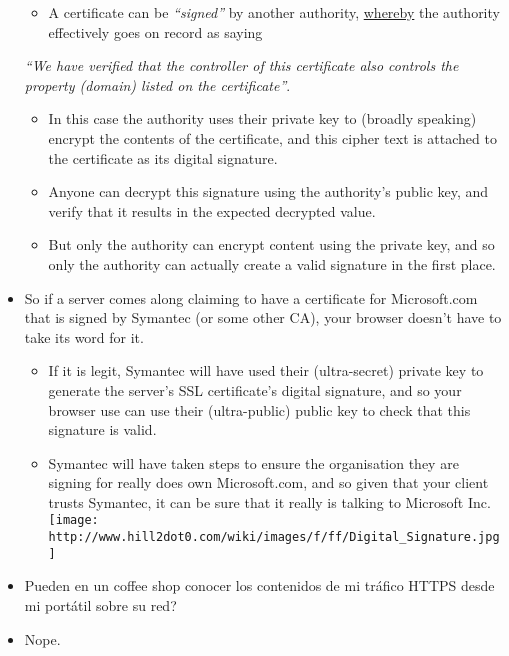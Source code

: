 \begin{itemize}
  \begin{itemize}
  \itemsep1pt\parskip0pt
  \item
    A certificate can be \emph{``signed''} by another authority,
    \href{https://www.google.es/webhp?sourceid=chrome-instant\&ion=1\&espv=2\&ie=UTF-8\#q=define\%20whereby}{whereby}
    the authority effectively goes on record as saying
  \end{itemize}

  \emph{``We have verified that the controller of this certificate also
  controls the property (domain) listed on the certificate''}.

  \begin{itemize}
  \itemsep1pt\parskip0pt
  \item
    In this case the authority uses their private key to (broadly
    speaking) encrypt the contents of the certificate, and this cipher
    text is attached to the certificate as its digital signature.
  \item
    Anyone can decrypt this signature using the authority's public key,
    and verify that it results in the expected decrypted value.
  \item
    But only the authority can encrypt content using the private key,
    and so only the authority can actually create a valid signature in
    the first place.
  \end{itemize}
\item
  So if a server comes along claiming to have a certificate for
  Microsoft.com that is signed by Symantec (or some other CA), your
  browser doesn't have to take its word for it.

  \begin{itemize}
  \itemsep1pt\parskip0pt
  \item
    If it is legit, Symantec will have used their (ultra-secret) private
    key to generate the server's SSL certificate's digital signature,
    and so your browser use can use their (ultra-public) public key to
    check that this signature is valid.
  \item
    Symantec will have taken steps to ensure the organisation they are
    signing for really does own Microsoft.com, and so given that your
    client trusts Symantec, it can be sure that it really is talking to
    Microsoft Inc.
    \texttt{[image: http://www.hill2dot0.com/wiki/images/f/ff/Digital\_Signature.jpg]}
  \end{itemize}
\item
  Pueden en un coffee shop conocer los contenidos de mi tráfico HTTPS
  desde mi portátil sobre su red?
\item
  Nope.


\end{itemize}
